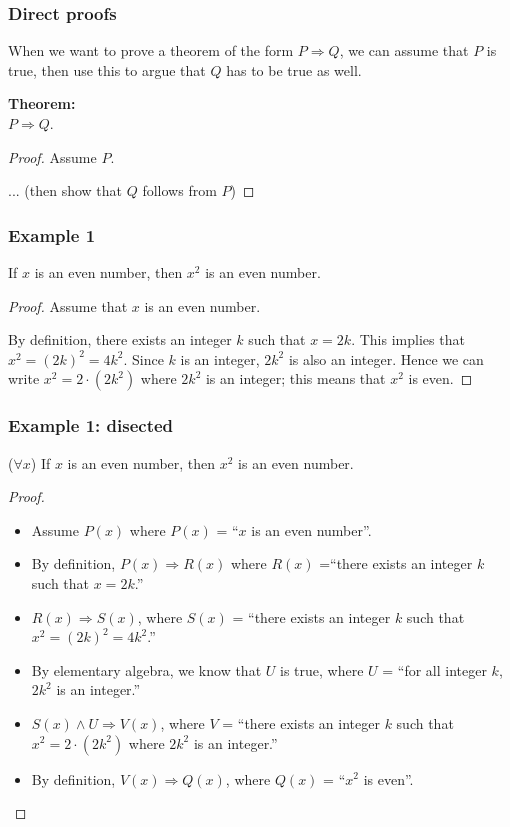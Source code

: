 \begin{frame}\frametitle{Direct proofs}
  When we want to prove a theorem of the form $P\Rightarrow Q$, we can
  assume that $P$ is true, then use this to argue that $Q$ has to be
  true as well.

  \begin{tcolorbox}[title=Direct proofs]
    {\bf Theorem:} \\
      $P\Rightarrow Q$.
    \begin{proof}
      Assume $P$.
      
      ... (then show that $Q$ follows from $P$)
    \end{proof}
  \end{tcolorbox}
\end{frame}

\begin{frame}\frametitle{Example 1}
  \begin{theorem}
    If $x$ is an even number, then $x^2$ is an even number.
  \end{theorem} \pause
  \begin{proof}
    Assume that $x$ is an even number. \pause

    By definition, there exists an integer $k$ such that
    $x=2k$. \pause This implies that $x^2 = (2k)^2 = 4k^2$.  \pause
    Since $k$ is an integer, $2k^2$ is also an integer.  Hence we can
    write $x^2 = 2\cdot (2k^2)$ where $2k^2$ is an integer; this means
    that $x^2$ is even.
  \end{proof}
\end{frame}

\begin{frame}\frametitle{Example 1: disected}
  \begin{theorem}
    ($\forall x$) If $x$ is an even number, then $x^2$ is an even
    number.
  \end{theorem} \pause
  \begin{proof}
    {\small
      \begin{itemize}
      \item Assume $P(x)$ where $P(x)$ = ``$x$ is an even
        number''. \pause
      \item By definition, $P(x)\Rightarrow R(x)$ where $R(x)$ =``there
        exists an integer $k$ such that $x=2k$.'' \pause
      \item $R(x)\Rightarrow S(x)$, where $S(x)$ = ``there exists an
        integer $k$ such that $x^2 = (2k)^2 = 4k^2$.''  \pause
      \item By elementary algebra, we know that $U$ is true, where $U$ =
        ``for all integer $k$, $2k^2$ is an integer.''  \pause
      \item $S(x)\wedge U\Rightarrow V(x)$, where $V$ = ``there exists
        an integer $k$ such that $x^2 = 2\cdot (2k^2)$ where $2k^2$ is
        an integer.'' \pause
      \item By definition, $V(x)\Rightarrow Q(x)$, where $Q(x)$ = ``$x^2$
        is even''.
      \end{itemize}
    }
  \end{proof}
\end{frame}

